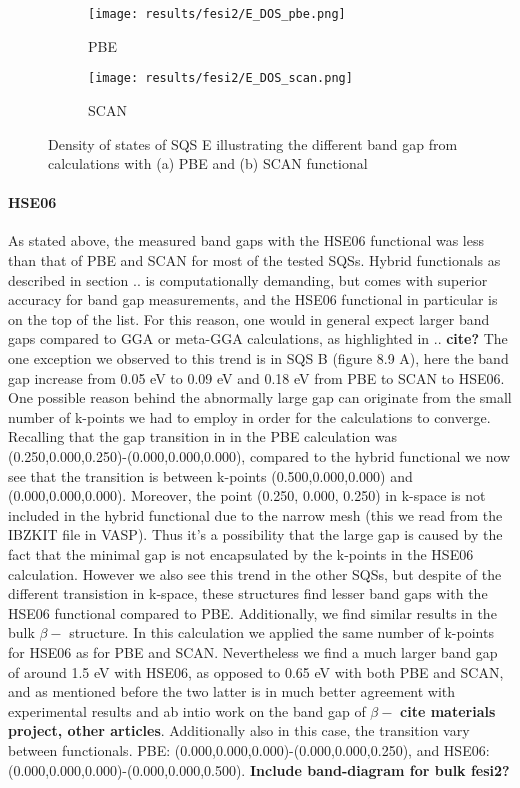 \begin{figure}[H]
	\begin{subfigure}{.5\textwidth}
		\texttt{[image: results/fesi2/E\_DOS\_pbe.png]}
		\caption{PBE}
	\end{subfigure}
	\begin{subfigure}{.5\textwidth}
		\texttt{[image: results/fesi2/E\_DOS\_scan.png]}
		\caption{SCAN}
	\end{subfigure}
	\caption{Density of states of SQS E illustrating the different band gap from calculations with (a) PBE and (b) SCAN functional}
\end{figure}

\paragraph{HSE06 \\}
As stated above, the measured band gaps with the HSE06 functional was less than that of PBE and SCAN for most of the tested SQSs. Hybrid functionals as described in section .. is computationally demanding, but comes with superior accuracy for band gap measurements, and the HSE06 functional in particular is on the top of the list. For this reason, one would in general expect larger band gaps compared to GGA or meta-GGA calculations, as highlighted in .. \textbf{cite?} The one exception we observed to this trend is in SQS B (figure 8.9 A), here the band gap increase from 0.05 eV to 0.09 eV and 0.18 eV from PBE to SCAN to HSE06. One possible reason behind the abnormally large gap can originate from the small number of k-points we had to employ in order for the calculations to converge. Recalling that the gap transition in in the PBE calculation was (0.250,0.000,0.250)-(0.000,0.000,0.000), compared to the hybrid functional we now see that the transition is between k-points (0.500,0.000,0.000) and (0.000,0.000,0.000). Moreover, the point (0.250, 0.000, 0.250) in k-space is not included in the hybrid functional due to the narrow mesh (this we read from the IBZKIT file in VASP). Thus it's a possibility that the large gap is caused by the fact that the minimal gap is not encapsulated by the k-points in the HSE06 calculation. However we also see this trend in the other SQSs, but despite of the different transistion in k-space, these structures find lesser band gaps with the HSE06 functional compared to PBE. Additionally, we find similar results in the bulk $\beta-$ structure. In this calculation we applied the same number of k-points for HSE06 as for PBE and SCAN. Nevertheless we find a much larger band gap of around 1.5 eV with HSE06, as opposed to 0.65 eV with both PBE and SCAN, and as mentioned before the two latter is in much better agreement with experimental results and ab intio work on the band gap of $\beta-$ \textbf{cite materials project, other articles}. Additionally also in this case, the transition vary between functionals. PBE: (0.000,0.000,0.000)-(0.000,0.000,0.250), and HSE06: (0.000,0.000,0.000)-(0.000,0.000,0.500). \textbf{Include band-diagram for bulk fesi2?} 

